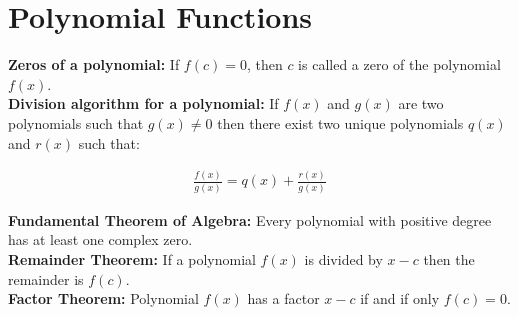 \section{Polynomial Functions}

\noindent
\textbf{Zeros of a polynomial:}{ }If $f(c) = 0$, then $c$ is called a zero of the polynomial $f(x)$. \\

\noindent
\textbf{Division algorithm for a polynomial:}{ }If $f(x)$ and $g(x)$ are two polynomials such that $g(x)\neq0$ then there exist two unique polynomials $q(x)$ and $r(x)$ such that: \\

\noindent
\begin{tcolorbox}
\begin{align}
\frac{f(x)}{g(x)} = q(x) + \frac{r(x)}{g(x)}
\end{align}
\end{tcolorbox}

\noindent
\textbf{Fundamental Theorem of Algebra:}{ }Every polynomial with positive degree has at least one complex zero. \\

\noindent
\textbf{Remainder Theorem:}{ }If a polynomial $f(x)$ is divided by $x-c$ then the remainder is $f(c)$. \\

\noindent
\textbf{Factor Theorem:}{ }Polynomial $f(x)$ has a factor $x-c$ if and if only $f(c) = 0$.

